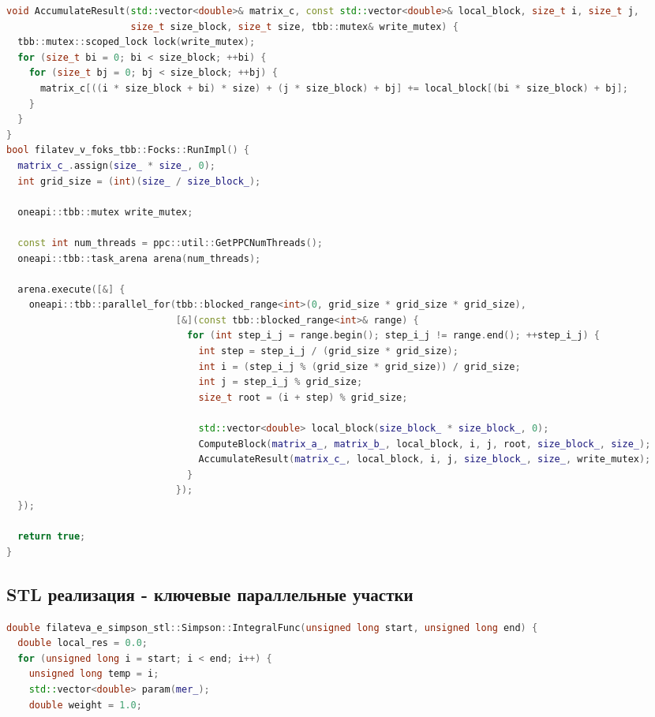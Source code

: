 \documentclass[12pt]{article}
\begin{document}
\begin{thebibliography}{99}
\begin{lstlisting}[language=C++]
void AccumulateResult(std::vector<double>& matrix_c, const std::vector<double>& local_block, size_t i, size_t j,
                      size_t size_block, size_t size, tbb::mutex& write_mutex) {
  tbb::mutex::scoped_lock lock(write_mutex);
  for (size_t bi = 0; bi < size_block; ++bi) {
    for (size_t bj = 0; bj < size_block; ++bj) {
      matrix_c[((i * size_block + bi) * size) + (j * size_block) + bj] += local_block[(bi * size_block) + bj];
    }
  }
}
bool filatev_v_foks_tbb::Focks::RunImpl() {
  matrix_c_.assign(size_ * size_, 0);
  int grid_size = (int)(size_ / size_block_);

  oneapi::tbb::mutex write_mutex;

  const int num_threads = ppc::util::GetPPCNumThreads();
  oneapi::tbb::task_arena arena(num_threads);

  arena.execute([&] {
    oneapi::tbb::parallel_for(tbb::blocked_range<int>(0, grid_size * grid_size * grid_size),
                              [&](const tbb::blocked_range<int>& range) {
                                for (int step_i_j = range.begin(); step_i_j != range.end(); ++step_i_j) {
                                  int step = step_i_j / (grid_size * grid_size);
                                  int i = (step_i_j % (grid_size * grid_size)) / grid_size;
                                  int j = step_i_j % grid_size;
                                  size_t root = (i + step) % grid_size;

                                  std::vector<double> local_block(size_block_ * size_block_, 0);
                                  ComputeBlock(matrix_a_, matrix_b_, local_block, i, j, root, size_block_, size_);
                                  AccumulateResult(matrix_c_, local_block, i, j, size_block_, size_, write_mutex);
                                }
                              });
  });

  return true;
}
\end{lstlisting}
\newpage

\subsection{STL реализация - ключевые параллельные участки}
\begin{lstlisting}[language=C++]
double filateva_e_simpson_stl::Simpson::IntegralFunc(unsigned long start, unsigned long end) {
  double local_res = 0.0;
  for (unsigned long i = start; i < end; i++) {
    unsigned long temp = i;
    std::vector<double> param(mer_);
    double weight = 1.0;


\end{lstlisting}
\end{thebibliography}
\end{document}
